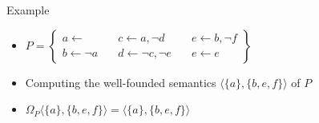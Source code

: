 \begin{frame}{Example}
  \bigskip
  \begin{itemize}
  \item
    \(
    P
    =
    \left\{
      \begin{array}{lll}
        a \leftarrow                \quad &
        c \leftarrow a, \neg d      \quad &
        e \leftarrow b, \neg f
        \\
        b \leftarrow \neg a         \quad &
        d \leftarrow \neg c, \neg e \quad &
        e \leftarrow e
      \end{array}
    \right\}
    \)
  \bigskip
\item Computing the well-founded semantics
  \(
  \langle\{a\},\{b,e,f\}\rangle
  \)
  of $P$
  \medskip
\item {} \quad
  \(
  \Omega_P\langle\{a\},\{b,e,f\}\rangle=\langle\{a\},\{b,e,f\}\rangle
  \)
  \end{itemize}
\end{frame}
%
